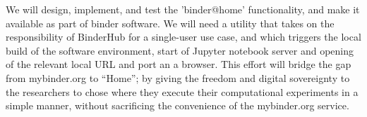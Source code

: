 \begin{task}
We will design, implement, and test the 'binder@home' functionality, and make it
available as part of binder software. We will need a utility that takes on
the responsibility of BinderHub for a single-user use case, and which triggers
the local build of the software environment, start of Jupyter notebook
server and opening of the relevant local URL and port an a browser.
This effort will bridge the gap from mybinder.org to ``Home'';
by giving the freedom and digital sovereignty
to the researchers to chose where they execute their computational experiments in a simple manner,
without sacrificing the convenience of the mybinder.org service.


\end{task}
